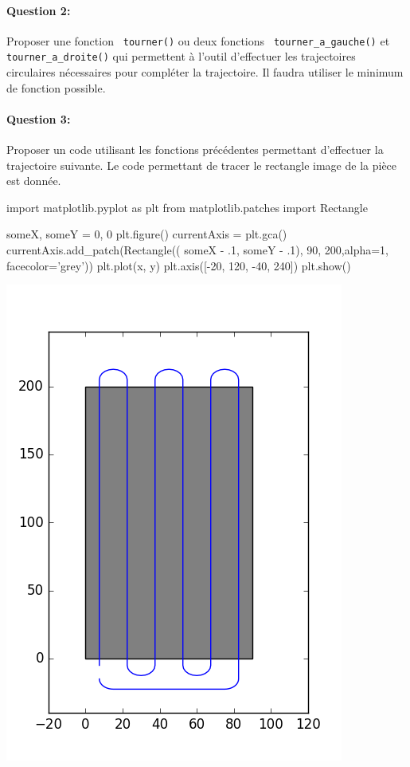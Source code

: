 \paragraph{Question 2:} Proposer une fonction \verb? tourner()? ou deux fonctions \verb? tourner_a_gauche()? et \verb? tourner_a_droite()? qui permettent à l'outil d'effectuer les trajectoires circulaires nécessaires pour compléter la trajectoire. Il faudra utiliser le minimum de fonction possible.

\paragraph{Question 3:} Proposer un code utilisant les fonctions précédentes permettant d'effectuer la trajectoire suivante. Le code permettant de tracer le rectangle image de la pièce est donnée.

\begin{minipage}{0.55\linewidth}
\begin{GrayBox}[0.85\textwidth]
\small\begin{verbatimtab}[3]
import matplotlib.pyplot as plt
from matplotlib.patches import Rectangle

someX, someY = 0, 0
plt.figure()
currentAxis = plt.gca()
currentAxis.add_patch(Rectangle((
	someX - .1, someY - .1), 90, 
	200,alpha=1, facecolor='grey'))
plt.plot(x, y)
plt.axis([-20, 120, -40, 240])
plt.show()
\end{verbatimtab}
\end{GrayBox}
\end{minipage}\hfill
\begin{minipage}{0.4\linewidth}
\begin{center}
 \includegraphics[width=0.8\linewidth]{img/fig2.png}
\end{center}
\end{minipage}



